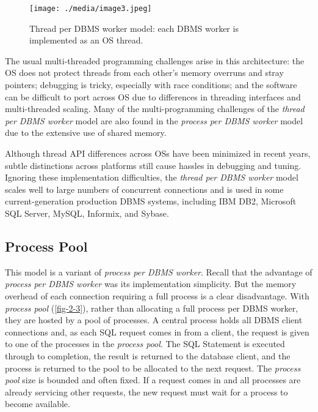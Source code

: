 \documentclass[b5paper,11pt,twoside,openright]{book}
\begin{document}
\begin{figure}
\centering
\texttt{[image: ./media/image3.jpeg]}

\caption{Thread per DBMS worker model: each DBMS worker is implemented
as an OS thread.\label{fig-2-2}}
\end{figure}

The usual multi-threaded programming challenges arise in this
architecture: the OS does not protect threads from each other's memory
overruns and stray pointers; debugging is tricky, especially with race
conditions; and the software can be difficult to port across OS due to
differences in threading interfaces and multi-threaded scaling. Many of
the multi-programming challenges of the \emph{thread per DBMS worker}
model are also found in the \emph{process per DBMS worker} model due to
the extensive use of shared memory.

Although thread API differences across OSs have been minimized in recent
years, subtle distinctions across platforms still cause hassles in
debugging and tuning. Ignoring these implementation difficulties, the
\emph{thread per DBMS worker} model scales well to large numbers of
concurrent connections and is used in some current-generation
production DBMS systems, including IBM DB2, Microsoft SQL Server, MySQL,
Informix, and Sybase.

\hypertarget{process-pool}{%
\subsection{Process Pool}\label{process-pool}}

This model is a variant of \emph{process per DBMS worker}. Recall that
the advantage of \emph{process per DBMS worker} was its implementation
simplicity. But the memory overhead of each connection requiring a full
process is a clear disadvantage. With \emph{process pool} (\autoref{fig-2-3}),
rather than allocating a full process per DBMS worker, they are hosted
by a pool of processes. A central process holds all DBMS client
connections and, as each SQL request comes in from a client, the request
is given to one of the processes in the \emph{process pool}. The SQL
Statement is executed through to completion, the result is returned to
the database client, and the process is returned to the pool to be
allocated to the next request. The \emph{process pool} size is bounded
and often fixed. If a request comes in
and all processes are already servicing other requests, the new request
must wait for a process to become available.
\end{document}
